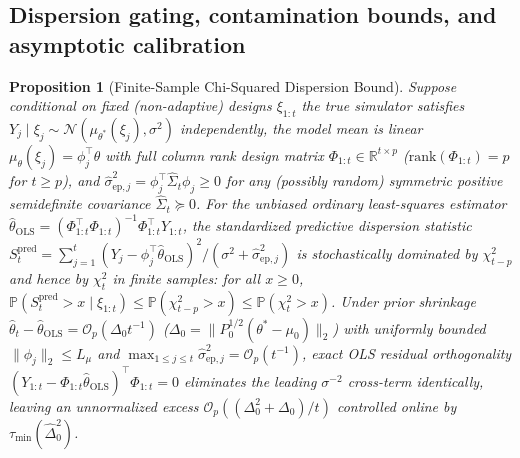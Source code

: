 \documentclass[11pt,a4paper,reqno]{amsart}
\newtheorem{proposition}[theorem]{Proposition}
\theoremstyle{definition}
\theoremstyle{remark}
\newcommand{\R}{\mathbb{R}}
\newcommand{\Prob}{\mathbb{P}}
\newcommand{\Ncal}{\mathcal{N}}
\begin{document}
\subsection{Dispersion gating, contamination bounds, and asymptotic calibration}

\begin{proposition}[Finite-Sample Chi-Squared Dispersion Bound]\label{prop:chi2_domination}
Suppose conditional on fixed (non-adaptive) designs $\xi_{1:t}$ the true simulator satisfies $Y_j \mid \xi_j \sim \Ncal(\mu_{\theta^*}(\xi_j), \sigma^2)$ independently, the model mean is linear $\mu_\theta(\xi_j) = \phi_j^\top \theta$ with full column rank design matrix $\Phi_{1:t} \in \R^{t \times p}$ ($\mathrm{rank}(\Phi_{1:t}) = p$ for $t \ge p$), and $\hat{\sigma}_{\mathrm{ep},j}^2 = \phi_j^\top \hat{\Sigma}_t \phi_j \ge 0$ for any (possibly random) symmetric positive semidefinite covariance $\hat{\Sigma}_t \succeq 0$. For the unbiased ordinary least-squares estimator $\hat{\theta}_{\mathrm{OLS}} = (\Phi_{1:t}^\top \Phi_{1:t})^{-1} \Phi_{1:t}^\top Y_{1:t}$, the standardized predictive dispersion statistic $S_t^{\mathrm{pred}} = \sum_{j=1}^t (Y_j - \phi_j^\top \hat{\theta}_{\mathrm{OLS}})^2 / (\sigma^2 + \hat{\sigma}_{\mathrm{ep},j}^2)$ is stochastically dominated by $\chi^2_{t-p}$ and hence by $\chi^2_t$ in finite samples: for all $x \ge 0$, $\Prob(S_t^{\mathrm{pred}} > x \mid \xi_{1:t}) \le \Prob(\chi^2_{t-p} > x) \le \Prob(\chi^2_t > x)$. Under prior shrinkage $\hat{\theta}_t - \hat{\theta}_{\mathrm{OLS}} = \mathcal{O}_p(\Delta_0 t^{-1})$ ($\Delta_0 = \|P_0^{1/2}(\theta^* - \mu_0)\|_2$) with uniformly bounded $\|\phi_j\|_2 \le L_\mu$ and $\max_{1\le j\le t}\hat{\sigma}_{\mathrm{ep},j}^2 = \mathcal{O}_p(t^{-1})$, exact OLS residual orthogonality $(Y_{1:t} - \Phi_{1:t}\hat{\theta}_{\mathrm{OLS}})^\top \Phi_{1:t} = 0$ eliminates the leading $\sigma^{-2}$ cross-term identically, leaving an unnormalized excess $\mathcal{O}_p((\Delta_0^2 + \Delta_0)/t)$ controlled online by $\tau_{\min}(\hat{\Delta}_0^2)$.
\end{proposition}
\end{document}
